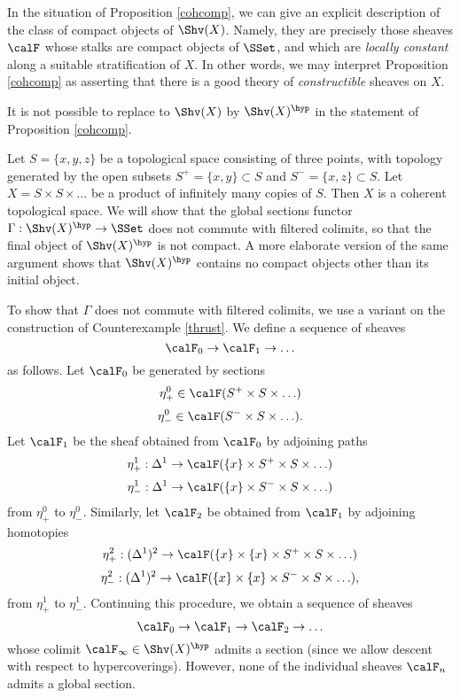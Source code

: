 \begin{itemize}
\begin{remark}
In the situation of Proposition \ref{cohcomp}, we can give an explicit description of the class of compact objects of $\Shv(X)$. Namely, they are precisely those sheaves $\calF$ whose stalks are compact objects of $\SSet$, and which are {\em locally constant} along a suitable stratification of $X$. In other words, we may interpret Proposition \ref{cohcomp} as asserting that there is a good theory of {\em constructible} sheaves on $X$.
\end{remark}

It is not possible to replace to $\Shv(X)$ by $\Shv(X)^{\hyp}$ in the statement of Proposition \ref{cohcomp}.

\begin{counterexample}\label{trust}
Let $S = \{ x,y,z \}$ be a topological space consisting of three points, with topology generated
by the open subsets $S^{+} = \{x,y\} \subset S$ and $S^{-} = \{x,z\} \subset S$.
Let $X = S \times S \times \ldots$ be a product of infinitely many copies of $S$.
Then $X$ is a coherent topological space. We will show that the global sections functor
$\Gamma: \Shv(X)^{\hyp} \rightarrow \SSet$ does not commute with filtered colimits, so that
the final object of $\Shv(X)^{\hyp}$ is not compact. A more elaborate version of the same argument shows that $\Shv(X)^{\hyp}$ contains no compact objects other than its initial object.

To show that $\Gamma$ does not commute with filtered colimits, we use a variant on the
construction of Counterexample \ref{thrust}. We define a sequence of
sheaves $$\calF_0 \rightarrow \calF_1 \rightarrow \ldots $$
as follows. Let $\calF_0$ be generated by sections
$$ \eta^0_{+} \in \calF(S^{+} \times S \times \ldots) $$
$$ \eta^0_{-} \in \calF(S^{-} \times S \times \ldots). $$
Let $\calF_1$ be the sheaf obtained from $\calF_0$ by adjoining
paths 
$$ \eta^{1}_{+}: \Delta^1 \rightarrow \calF( \{x\} \times S^{+} \times S \times \ldots )$$
$$ \eta^{1}_{-}: \Delta^1 \rightarrow \calF( \{x\} \times S^{-} \times S \times \ldots )$$
from $\eta^0_{+}$ to $\eta^{0}_{-}$.
Similarly, let $\calF_2$ be obtained from $\calF_1$ by adjoining homotopies
$$ \eta^2_{+}: (\Delta^1)^2 \rightarrow \calF( \{x\} \times \{x\} \times S^{+} \times S \times \ldots )$$
$$ \eta^2_{-}: (\Delta^1)^2 \rightarrow \calF( \{x \} \times \{x\} \times S^{-} \times S \times \ldots ),$$
from $\eta^1_{+}$ to $\eta^{1}_{-}$. Continuing this procedure, we obtain a
sequence of sheaves $$\calF_0 \rightarrow \calF_1 \rightarrow \calF_2 \rightarrow \ldots $$
whose colimit $\calF_{\infty} \in \Shv(X)^{\hyp}$ admits a section (since we allow descent
with respect to hypercoverings). However, none of the individual sheaves $\calF_n$ admits a global section.
\end{counterexample}


\end{itemize}
